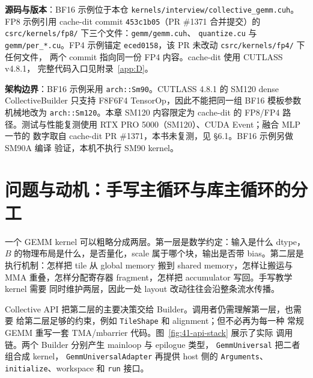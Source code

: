 \textbf{源码与版本}：BF16 示例位于本仓
\texttt{kernels/interview/collective\_gemm.cuh}。FP8 示例引用 cache-dit
commit \texttt{453c1b05}（PR \#1371 合并提交）的
\texttt{csrc/kernels/fp8/} 下三个文件：\texttt{gemm/gemm.cuh}、
\texttt{quantize.cu} 与 \texttt{gemm/per\_*.cu}。FP4 示例锚定
\texttt{eced0158}，该 PR 未改动 \texttt{csrc/kernels/fp4/} 下任何文件，
两个 commit 指向同一份 FP4 内容。cache-dit 使用 CUTLASS v4.8.1，
完整代码入口见附录~\ref{app:D}。

\textbf{架构边界}：BF16 示例采用 \texttt{arch::Sm90}。CUTLASS 4.8.1 的 SM120
dense CollectiveBuilder 只支持 F8F6F4 TensorOp，因此不能把同一组 BF16 模板参数
机械地改为 \texttt{arch::Sm120}。本章 SM120 内容限定为 cache-dit 的 FP8/FP4
路径。测试与性能复测使用 RTX PRO 5000（SM120）、CUDA Event；融合 MLP 一节的
数字取自 cache-dit PR \#1371，本书未复测，见 \S6.1。BF16 示例另做 SM90A 编译
验证，本机不执行 SM90 kernel。

\section{问题与动机：手写主循环与库主循环的分工}

一个 GEMM  kernel 可以粗略分成两层。第一层是数学约定：输入是什么 dtype，
$B$ 的物理布局是什么，是否量化，scale 属于哪个块，输出是否带 bias。第二层是
执行机制：怎样把 tile 从 global memory 搬到 shared memory，怎样让搬运与 MMA
重叠，怎样分配寄存器 fragment，怎样把 accumulator 写回。手写教学 kernel 需要
同时维护两层，因此一处 layout 改动往往会沿整条流水传播。

Collective API 把第二层的主要决策交给 Builder。调用者仍需理解第一层，也需要
给第二层足够的约束，例如 \texttt{TileShape} 和 alignment；但不必再为每一种
常规 GEMM 重写一套 TMA/mbarrier 代码。图~\ref{fig:41-api-stack} 展示了实际
调用链。两个 Builder 分别产生 mainloop 与 epilogue 类型，
\texttt{GemmUniversal} 把二者组合成 kernel，
\texttt{GemmUniversalAdapter} 再提供 host 侧的 \texttt{Arguments}、
\texttt{initialize}、workspace 和 \texttt{run} 接口。

